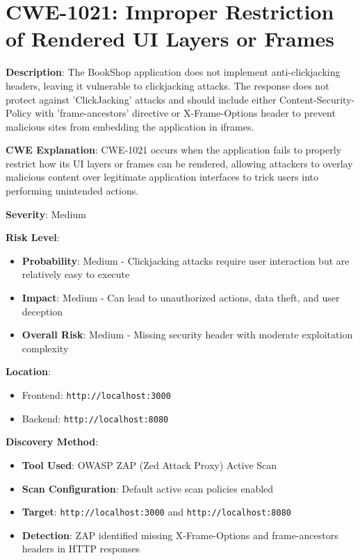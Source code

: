 \documentclass[]{UCD_CS_FYP_Report}
\begin{document}
\section{CWE-1021: Improper Restriction of Rendered UI Layers or Frames}

\textbf{Description}: The BookShop application does not implement anti-clickjacking headers, leaving it vulnerable to clickjacking attacks. The response does not protect against 'ClickJacking' attacks and should include either Content-Security-Policy with 'frame-ancestors' directive or X-Frame-Options header to prevent malicious sites from embedding the application in iframes.

\textbf{CWE Explanation}: CWE-1021 occurs when the application fails to properly restrict how its UI layers or frames can be rendered, allowing attackers to overlay malicious content over legitimate application interfaces to trick users into performing unintended actions.

\textbf{Severity}: Medium

\textbf{Risk Level}: 
\begin{itemize}
    \item \textbf{Probability}: Medium - Clickjacking attacks require user interaction but are relatively easy to execute
    \item \textbf{Impact}: Medium - Can lead to unauthorized actions, data theft, and user deception
    \item \textbf{Overall Risk}: Medium - Missing security header with moderate exploitation complexity
\end{itemize}

\textbf{Location}: 
\begin{itemize}
    \item Frontend: \texttt{http://localhost:3000}
    \item Backend: \texttt{http://localhost:8080}
\end{itemize}

\textbf{Discovery Method}: 
\begin{itemize}
    \item \textbf{Tool Used}: OWASP ZAP (Zed Attack Proxy) Active Scan
    \item \textbf{Scan Configuration}: Default active scan policies enabled
    \item \textbf{Target}: \texttt{http://localhost:3000} and \texttt{http://localhost:8080}
    \item \textbf{Detection}: ZAP identified missing X-Frame-Options and frame-ancestors headers in HTTP responses
\end{itemize}
\end{document}

